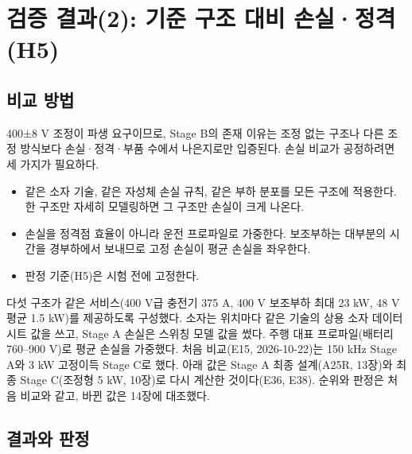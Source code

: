 \chapter{검증 결과(2): 기준 구조 대비 손실·정격(H5)}

\section{비교 방법}

400±8 V 조정이 파생 요구이므로, Stage B의 존재 이유는 조정 없는 구조나 다른 조정 방식보다 손실·정격·부품 수에서 나은지로만 입증된다. 손실 비교가 공정하려면 세 가지가 필요하다.

\begin{itemize}
\item 같은 소자 기술, 같은 자성체 손실 규칙, 같은 부하 분포를 모든 구조에 적용한다. 한 구조만 자세히 모델링하면 그 구조만 손실이 크게 나온다.
\item 손실을 정격점 효율이 아니라 운전 프로파일로 가중한다. 보조부하는 대부분의 시간을 경부하에서 보내므로 고정 손실이 평균 손실을 좌우한다\cite{b11}.
\item 판정 기준(H5)은 시험 전에 고정한다.
\end{itemize}

다섯 구조가 같은 서비스(400 V급 충전기 375 A, 400 V 보조부하 최대 23 kW, 48 V 평균 1.5 kW)를 제공하도록 구성했다. 소자는 위치마다 같은 기술의 상용 소자 데이터시트 값\cite{b12,b13,b14,b15}을 쓰고, Stage A 손실은 스위칭 모델 값을 썼다. 주행 대표 프로파일(배터리 760–900 V)로 평균 손실을 가중했다. 처음 비교(E15, 2026-10-22)는 150 kHz Stage A와 3 kW 고정이득 Stage C로 했다. 아래 값은 Stage A 최종 설계(A25R, 13장)와 최종 Stage C(조정형 5 kW, 10장)로 다시 계산한 것이다(E36, E38). 순위와 판정은 처음 비교와 같고, 바뀐 값은 14장에 대조했다.

\section{결과와 판정}

